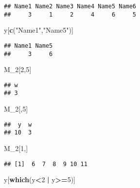 \documentclass[]{article}
\newenvironment{Shaded}{\begin{snugshade}}{\end{snugshade}}
\newcommand{\KeywordTok}[1]{\textcolor[rgb]{0.13,0.29,0.53}{\textbf{#1}}}
\newcommand{\DecValTok}[1]{\textcolor[rgb]{0.00,0.00,0.81}{#1}}
\newcommand{\StringTok}[1]{\textcolor[rgb]{0.31,0.60,0.02}{#1}}
\newcommand{\OperatorTok}[1]{\textcolor[rgb]{0.81,0.36,0.00}{\textbf{#1}}}
\newcommand{\NormalTok}[1]{#1}
\begin{document}
\begin{verbatim}
## Name1 Name2 Name3 Name4 Name5 Name6 
##     3     1     2     4     6     5
\end{verbatim}

\begin{Shaded}
\begin{Highlighting}[]
\NormalTok{y[}\KeywordTok{c}\NormalTok{(}\StringTok{"Name1"}\NormalTok{,}\StringTok{"Name5"}\NormalTok{)]}
\end{Highlighting}
\end{Shaded}

\begin{verbatim}
## Name1 Name5 
##     3     6
\end{verbatim}

\begin{Shaded}
\begin{Highlighting}[]
\NormalTok{M_}\DecValTok{2}\NormalTok{[}\DecValTok{2}\NormalTok{,}\DecValTok{5}\NormalTok{]}
\end{Highlighting}
\end{Shaded}

\begin{verbatim}
## w 
## 3
\end{verbatim}

\begin{Shaded}
\begin{Highlighting}[]
\NormalTok{M_}\DecValTok{2}\NormalTok{[,}\DecValTok{5}\NormalTok{]}
\end{Highlighting}
\end{Shaded}

\begin{verbatim}
##  y  w 
## 10  3
\end{verbatim}

\begin{Shaded}
\begin{Highlighting}[]
\NormalTok{M_}\DecValTok{2}\NormalTok{[}\DecValTok{1}\NormalTok{,]}
\end{Highlighting}
\end{Shaded}

\begin{verbatim}
## [1]  6  7  8  9 10 11
\end{verbatim}

\begin{Shaded}
\begin{Highlighting}[]
\NormalTok{y[}\KeywordTok{which}\NormalTok{(y}\OperatorTok{<}\DecValTok{2} \OperatorTok{|}\StringTok{ }\NormalTok{y}\OperatorTok{>=}\DecValTok{5}\NormalTok{)]}
\end{Highlighting}
\end{Shaded}
\end{document}

